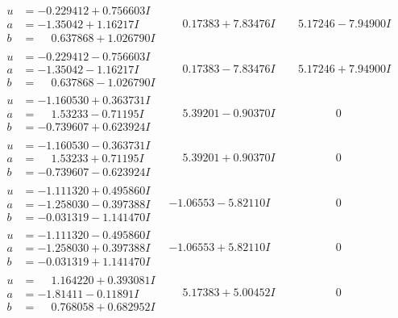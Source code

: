 \documentclass[1p]{elsarticle_modified}
\theoremstyle{definition}
\begin{document}
$$\begin{array}{c|c|c}
\begin{aligned}
u &= -0.229412 + 0.756603 I \\
a &= -1.35042 + 1.16217 I \\
b &= \phantom{-}0.637868 + 1.026790 I\end{aligned}
 & \phantom{-}0.17383 + 7.83476 I & \phantom{-}5.17246 - 7.94900 I \\ \hline\begin{aligned}
u &= -0.229412 - 0.756603 I \\
a &= -1.35042 - 1.16217 I \\
b &= \phantom{-}0.637868 - 1.026790 I\end{aligned}
 & \phantom{-}0.17383 - 7.83476 I & \phantom{-}5.17246 + 7.94900 I \\ \hline\begin{aligned}
u &= -1.160530 + 0.363731 I \\
a &= \phantom{-}1.53233 - 0.71195 I \\
b &= -0.739607 + 0.623924 I\end{aligned}
 & \phantom{-}5.39201 - 0.90370 I & \phantom{-0.000000 } 0 \\ \hline\begin{aligned}
u &= -1.160530 - 0.363731 I \\
a &= \phantom{-}1.53233 + 0.71195 I \\
b &= -0.739607 - 0.623924 I\end{aligned}
 & \phantom{-}5.39201 + 0.90370 I & \phantom{-0.000000 } 0 \\ \hline\begin{aligned}
u &= -1.111320 + 0.495860 I \\
a &= -1.258030 - 0.397388 I \\
b &= -0.031319 - 1.141470 I\end{aligned}
 & -1.06553 - 5.82110 I & \phantom{-0.000000 } 0 \\ \hline\begin{aligned}
u &= -1.111320 - 0.495860 I \\
a &= -1.258030 + 0.397388 I \\
b &= -0.031319 + 1.141470 I\end{aligned}
 & -1.06553 + 5.82110 I & \phantom{-0.000000 } 0 \\ \hline\begin{aligned}
u &= \phantom{-}1.164220 + 0.393081 I \\
a &= -1.81411 - 0.11891 I \\
b &= \phantom{-}0.768058 + 0.682952 I\end{aligned}
 & \phantom{-}5.17383 + 5.00452 I & \phantom{-0.000000 } 0 \\ \hline\begin{aligned}

\end{aligned}
\end{array}$$
\end{document}
